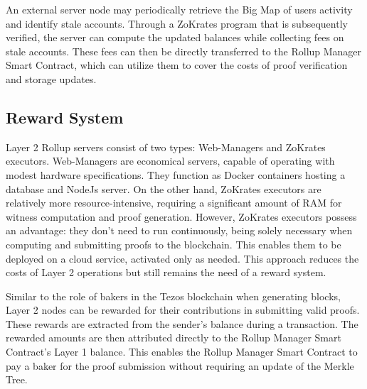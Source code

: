 An external server node may periodically retrieve the Big Map of users activity and identify stale accounts. Through a ZoKrates program that is subsequently verified, the server can compute the updated balances while collecting fees on stale accounts. These fees can then be directly transferred to the Rollup Manager Smart Contract, which can utilize them to cover the costs of proof verification and storage updates.

\subsection{Reward System}

Layer 2 Rollup servers consist of two types: Web-Managers and ZoKrates executors. Web-Managers are economical servers, capable of operating with modest hardware specifications. They function as Docker containers hosting a database and NodeJs server. On the other hand, ZoKrates executors are relatively more resource-intensive, requiring a significant amount of RAM for witness computation and proof generation. However, ZoKrates executors possess an advantage: they don't need to run continuously, being solely necessary when computing and submitting proofs to the blockchain. This enables them to be deployed on a cloud service, activated only as needed. This approach reduces the costs of Layer 2 operations but still remains the need of a reward system.

Similar to the role of bakers in the Tezos blockchain when generating blocks, Layer 2 nodes can be rewarded for their contributions in submitting valid proofs. These rewards are extracted from the sender's balance during a transaction. The rewarded amounts are then attributed directly to the Rollup Manager Smart Contract's Layer 1 balance. This enables the Rollup Manager Smart Contract to pay a baker for the proof submission without requiring an update of the Merkle Tree.
